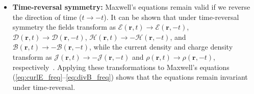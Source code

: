 \begin{itemize}


        \item \textbf{Time-reversal symmetry:} Maxwell's equations remain valid if
              we reverse the direction of time ($t\to-t$). It can be shown that under
              time-reversal symmetry
              the fields transform as
              $\bm{\mathcal{E}}(\mathbf{r}, t)\to\bm{\mathcal{E}}(\mathbf{r}, -t)$,
              $\bm{\mathcal{D}}(\mathbf{r}, t)\to\bm{\mathcal{D}}(\mathbf{r}, -t)$,
              $\bm{\mathcal{H}}(\mathbf{r},
                  t)\to-\bm{\mathcal{H}}(\mathbf{r}, -t)$, and $\bm{\mathcal{B}}(\mathbf{r},
                  t)\to-\bm{\mathcal{B}}(\mathbf{r}, -t)$, while the current density and charge
              density transform as
              $\bm{\mathcal{J}}(\mathbf{r},
                  t)\to-\bm{\mathcal{J}}(\mathbf{r}, -t)$ and $\bm{\mathcal{\rho}}(\mathbf{r},
                  t)\to\bm{\mathcal{\rho}}(\mathbf{r}, -t)$, respectively~\cite{reciprocity}.
              Applying these transformations
              to Maxwell's equations (\eqref{eq:curlE_freq}--\eqref{eq:divB_freq}) shows
              that the equations remain invariant under time-reversal. 
              

\end{itemize}
